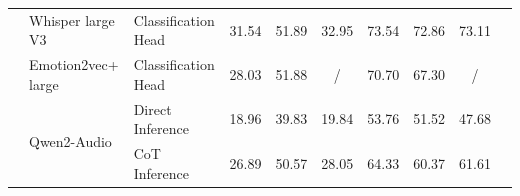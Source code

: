 \documentclass[11pt]{article}
\begin{document}
\begin{table}[ht]
\begin{tabularx}{\textwidth}{>{\raggedright\arraybackslash}p{1.55cm} llccccccc}
		                                     & Whisper large V3~\citep{radford2023robust}        & Classification Head              & 31.54                             & 51.89                                & 32.95                            & 73.54                            & 72.86                            & 73.11                            \\
		                                     & Emotion2vec+ large~\citep{ma2023emotion2vec}      & Classification Head              & 28.03                             & 51.88                                & /                                & 70.70                            & 67.30                            & /                                \\
		\midrule
		\multirow{2}{*}{LALM}
		                                     & \multirow{2}{*}{Qwen2-Audio~\cite{chu2024qwen2}}  & Direct Inference                 & 18.96                             & 39.83                                & 19.84                            & 53.76                            & 51.52                            & 47.68                            \\
		                                     &                                                   & CoT Inference                    & 26.89                             & 50.57                                & 28.05                            & 64.33                            & 60.37                            & 61.61                            \\
		\midrule


\end{tabularx}
\end{table}
\end{document}

